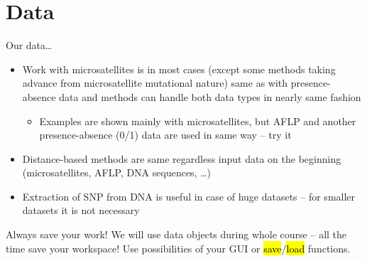 \documentclass[compress, ucs, xelatex, 11pt, xcolor=svgnames,
  hyperref={
    bookmarks=true,
    unicode=true,
    colorlinks=true,
    pdftitle={Molecular data in R},
    plainpages=false,
    pdfauthor={Vojtech Zeisek},
    pdfsubject={Course about phylogeny and evolution in R},
    pdfcreator={XeLaTeX},
    pdfkeywords={R, evolution, phylogeny, molecular data},
    linkcolor=Tomato,
    anchorcolor=SaddleBrown,
    citecolor=Goldenrod,
    filecolor=DarkMagenta,
    menucolor=Sienna,
    urlcolor=DarkTurquoise,
    pdftex},
  url={hyphens, lowtilde} %
  ]{beamer}
\renewcommand{\texttt}[1]{\hl{\ttfamily #1}}
\begin{document}
\section{Data}

\begin{frame}[allowframebreaks]{Our data\ldots}
  \begin{itemize}
    \item Work with microsatellites is in most cases (except some methods taking advance from microsatellite mutational nature) same as with presence-absence data and methods can handle both data types in nearly same fashion
    \begin{itemize}
      \item Examples are shown mainly with microsatellites, but AFLP and another presence-absence (0/1) data are used in same way -- try it
    \end{itemize}
    \item Distance-based methods are same regardless input data on the beginning (microsatellites, AFLP, DNA sequences, \ldots)
    \item Extraction of SNP from DNA is useful in case of huge datasets -- for smaller datasets it is not necessary
  \end{itemize}
  \begin{block}{Always save your work!}
    \alert{We will use data objects during whole course -- all the time save your workspace!} Use possibilities of your GUI or \texttt{save}/\texttt{load} functions.
  \end{block}
\end{frame}
\end{document}
